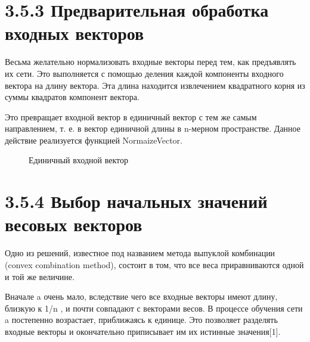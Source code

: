 \documentclass[14pt,a4paper]{extreport}
\begin{document}
            \section*{\normalsize\hspace{4ex}3.5.3 Предварительная обработка входных векторов}           
   \hspace {4ex} Весьма желательно нормализовать входные векторы перед тем, как предъявлять их сети. Это выполняется с помощью деления каждой компоненты входного вектора на длину вектора. Эта длина находится извлечением квадратного корня из суммы квадратов компонент вектора. \
   
   \hspace {4ex} Это превращает входной вектор в единичный вектор с тем же самым направлением, т. е. в вектор единичной длины в n-мерном пространстве. Данное действие реализуется функцией NormaizeVector.\
   
   \begin{figure}[h!]
\caption{Единичный входной вектор}
\end{figure}
   
            \section*{\normalsize\hspace{4ex}3.5.4 Выбор начальных значений весовых векторов}
            
   \hspace {4ex} Одно из решений, известное под названием метода выпуклой комбинации (convex combination method), состоит в том, что все веса приравниваются одной и той же величине.\       
   
   \hspace {4ex} Вначале a очень мало, вследствие чего все входные векторы имеют длину, близкую к 1/n , и почти совпадают с векторами весов. В процессе обучения сети a постепенно возрастает, приближаясь к единице. Это позволяет разделять входные векторы и окончательно приписывает им их истинные значения[1].\ 
   
\end{document}
